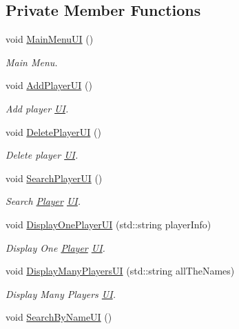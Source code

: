 \subsection*{Private Member Functions}
\begin{DoxyCompactItemize}
\item 
void \hyperlink{class_u_i_a71f83ea170aabaa01c54c333487662c6}{Main\+Menu\+U\+I} ()
\begin{DoxyCompactList}\small\item\em Main Menu. \end{DoxyCompactList}\item 
void \hyperlink{class_u_i_a629350d1b5329df149aede0bc78f08ac}{Add\+Player\+U\+I} ()
\begin{DoxyCompactList}\small\item\em Add player \hyperlink{class_u_i}{U\+I}. \end{DoxyCompactList}\item 
void \hyperlink{class_u_i_aa171dd3889be888cb19e9ec2c6279495}{Delete\+Player\+U\+I} ()
\begin{DoxyCompactList}\small\item\em Delete player \hyperlink{class_u_i}{U\+I}. \end{DoxyCompactList}\item 
void \hyperlink{class_u_i_a7a2e44a35502deacc79e6515c5f7f4fd}{Search\+Player\+U\+I} ()
\begin{DoxyCompactList}\small\item\em Search \hyperlink{class_player}{Player} \hyperlink{class_u_i}{U\+I}. \end{DoxyCompactList}\item 
void \hyperlink{class_u_i_a7e3dd2a3b99d2a7d1e1fb53c7225aeb3}{Display\+One\+Player\+U\+I} (std\+::string player\+Info)
\begin{DoxyCompactList}\small\item\em Display One \hyperlink{class_player}{Player} \hyperlink{class_u_i}{U\+I}. \end{DoxyCompactList}\item 
void \hyperlink{class_u_i_a6af2966e00ca4843bd865d1430045fc4}{Display\+Many\+Players\+U\+I} (std\+::string all\+The\+Names)
\begin{DoxyCompactList}\small\item\em Display Many Players \hyperlink{class_u_i}{U\+I}. \end{DoxyCompactList}\item 
void \hyperlink{class_u_i_a7a391f605879afdd228d5dd9b0c92d4e}{Search\+By\+Name\+U\+I} ()

\end{DoxyCompactItemize}
